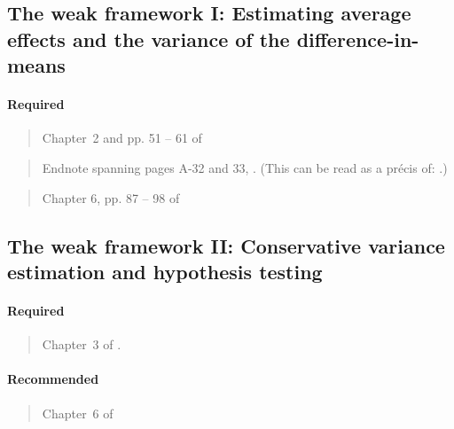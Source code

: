\documentclass[12pt]{article}
\begin{document}
\begin{verse}  \end{verse}

\subsection{The weak framework I: Estimating average effects and the variance of the difference-in-means}

\paragraph*{Required}

\begin{verse} Chapter~2 and pp. 51 -- 61 of  \end{verse}
\begin{verse}  \end{verse}
\begin{verse}  \end{verse}

\begin{verse} Endnote spanning pages A-32 and 33,
  .  (This can be read as a pr{\'e}cis
  of: .)
\end{verse}

\begin{verse} Chapter 6, pp. 87 -- 98 of  \end{verse}

\subsection{The weak framework II: Conservative variance estimation and hypothesis testing}

\paragraph*{Required}

\begin{verse}
  Chapter~3 of .
\end{verse}

\paragraph*{Recommended}

\begin{verse} Chapter~6 of  \end{verse}
\end{document}
